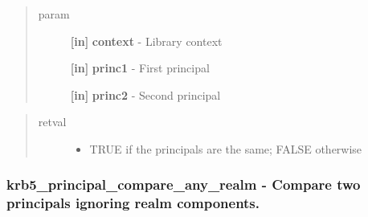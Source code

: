 \documentclass[letterpaper,10pt,english]{sphinxmanual}
\begin{document}
\begin{fulllineitems}
\label{appdev/refs/api/krb5_principal_compare:krb5_principal_compare}
\end{fulllineitems}

\begin{quote}\begin{description}
\item[{param}] \leavevmode
\textbf{{[}in{]}} \textbf{context} - Library context

\textbf{{[}in{]}} \textbf{princ1} - First principal

\textbf{{[}in{]}} \textbf{princ2} - Second principal

\end{description}\end{quote}
\begin{quote}\begin{description}
\item[{retval}] \leavevmode\begin{itemize}
\item {} 
TRUE   if the principals are the same; FALSE otherwise

\end{itemize}

\end{description}\end{quote}


\subsubsection{krb5\_principal\_compare\_any\_realm -  Compare two principals ignoring realm components.}
\label{appdev/refs/api/krb5_principal_compare_any_realm:krb5-principal-compare-any-realm-compare-two-principals-ignoring-realm-components}\label{appdev/refs/api/krb5_principal_compare_any_realm::doc}

\begin{fulllineitems}
\label{appdev/refs/api/krb5_principal_compare_any_realm:krb5_principal_compare_any_realm}
\end{fulllineitems}
\end{document}
